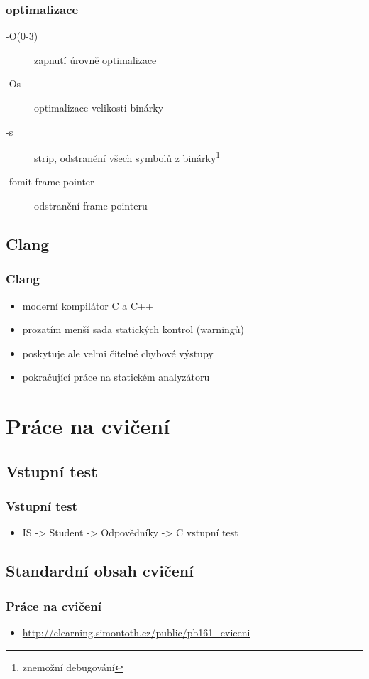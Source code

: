 \begin{frame}
	\frametitle{optimalizace}
	\begin{description}
		\item[-O(0-3)]{zapnutí úrovně optimalizace}
		\item[-Os]{optimalizace velikosti binárky}
		\item[-s]{strip, odstranění všech symbolů z binárky\footnote[1]{\alert{znemožní debugování}}}
		\item[-fomit-frame-pointer]{odstranění frame pointeru\footnotemark[1]}
	\end{description}
\end{frame}

\subsection{Clang}

\begin{frame}
	\frametitle{Clang}
	\begin{itemize}
		\item{moderní kompilátor C a C++}
		\item{prozatím menší sada statických kontrol (warningů)}
		\item{poskytuje ale velmi čitelné chybové výstupy}
		\item{pokračující práce na statickém analyzátoru}
	\end{itemize}
\end{frame}

\section{Práce na cvičení}
\subsection{Vstupní test}

\begin{frame}
	\frametitle{Vstupní test}
	\begin{itemize}
		\item{IS -> Student -> Odpovědníky -> C vstupní test}
	\end{itemize}
\end{frame}

\subsection{Standardní obsah cvičení}

\begin{frame}
	\frametitle{Práce na cvičení}
	\begin{itemize}
		\item{\href{http://elearning.simontoth.cz/public/pb161\_cviceni}{http://elearning.simontoth.cz/public/pb161\_cviceni}}
	\end{itemize}
\end{frame}





